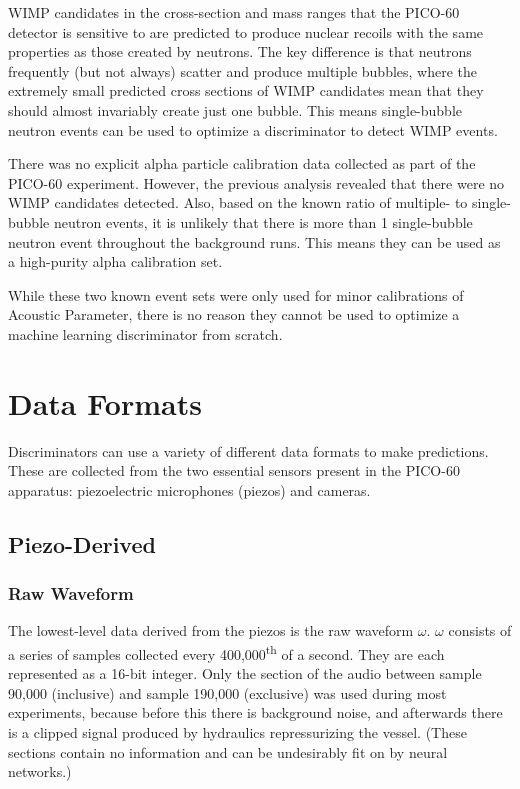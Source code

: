 \documentclass[10pt]{article}
\begin{document}
WIMP candidates in the cross-section and mass ranges that the PICO-60 detector is sensitive to are predicted to produce nuclear recoils with the same properties as those created by neutrons. The key difference is that neutrons frequently (but not always) scatter and produce multiple bubbles, where the extremely small predicted cross sections of WIMP candidates mean that they should almost invariably create just one bubble. This means single-bubble neutron events can be used to optimize a discriminator to detect WIMP events.

There was no explicit alpha particle calibration data collected as part of the PICO-60 experiment. However, the previous analysis revealed that there were no WIMP candidates detected. Also, based on the known ratio of multiple- to single-bubble neutron events, it is unlikely that there is more than 1 single-bubble neutron event throughout the background runs. This means they can be used as a high-purity alpha calibration set.

While these two known event sets were only used for minor calibrations of Acoustic Parameter, there is no reason they cannot be used to optimize a machine learning discriminator from scratch.

\section{Data Formats}

Discriminators can use a variety of different data formats to make predictions. These are collected from the two essential sensors present in the PICO-60 apparatus: piezoelectric microphones (piezos) and cameras.

\subsection{Piezo-Derived}

\subsubsection{Raw Waveform}

The lowest-level data derived from the piezos is the raw waveform $\omega$. $\omega$ consists of a series of samples collected every 400,000\textsuperscript{th} of a second. They are each represented as a 16-bit integer. Only the section of the audio between sample 90,000 (inclusive) and sample 190,000 (exclusive) was used during most experiments, because before this there is background noise, and afterwards there is a clipped signal produced by hydraulics repressurizing the vessel. (These sections contain no information and can be undesirably fit on by neural networks.)
\end{document}
